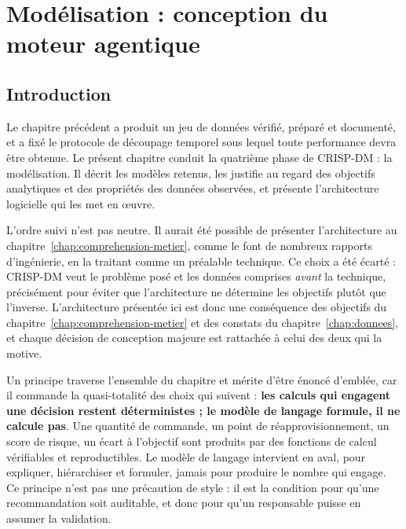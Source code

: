 %

\chapter{Modélisation : conception du moteur agentique}
\label{chap:modelisation}

\section*{Introduction}

Le chapitre précédent a produit un jeu de données vérifié, préparé et documenté, et a fixé le protocole de découpage temporel sous lequel toute performance devra être obtenue. Le présent chapitre conduit la quatrième phase de CRISP-DM : la modélisation. Il décrit les modèles retenus, les justifie au regard des objectifs analytiques et des propriétés des données observées, et présente l'architecture logicielle qui les met en œuvre.

L'ordre suivi n'est pas neutre. Il aurait été possible de présenter l'architecture au chapitre~\ref{chap:comprehension-metier}, comme le font de nombreux rapports d'ingénierie, en la traitant comme un préalable technique. Ce choix a été écarté : CRISP-DM veut le problème posé et les données comprises \textit{avant} la technique, précisément pour éviter que l'architecture ne détermine les objectifs plutôt que l'inverse. L'architecture présentée ici est donc une conséquence des objectifs du chapitre~\ref{chap:comprehension-metier} et des constats du chapitre~\ref{chap:donnees}, et chaque décision de conception majeure est rattachée à celui des deux qui la motive.

Un principe traverse l'ensemble du chapitre et mérite d'être énoncé d'emblée, car il commande la quasi-totalité des choix qui suivent : \textbf{les calculs qui engagent une décision restent déterministes ; le modèle de langage formule, il ne calcule pas}. Une quantité de commande, un point de réapprovisionnement, un score de risque, un écart à l'objectif sont produits par des fonctions de calcul vérifiables et reproductibles. Le modèle de langage intervient en aval, pour expliquer, hiérarchiser et formuler, jamais pour produire le nombre qui engage. Ce principe n'est pas une précaution de style : il est la condition pour qu'une recommandation soit auditable, et donc pour qu'un responsable puisse en assumer la validation.

